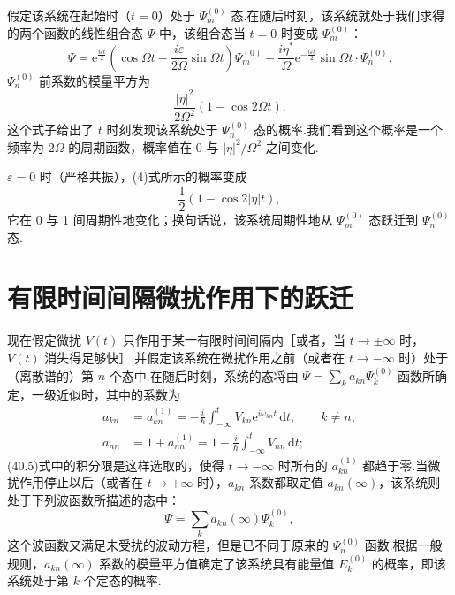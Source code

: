 \begin{xiti}
假定该系统在起始时（$t=0$）处于 $\varPsi_m^{(0)}$ 态.在随后时刻，该系统就处于我们求得的两个函数的线性组合态 $\varPsi$ 中，该组合态当 $t=0$ 时变成 $\varPsi_m^{(0)}$：
\begin{equation}
  \varPsi=\mathrm{e}^{\frac{i\varepsilon t}{2}}
  \left(\cos\Omega t-\frac{i\varepsilon}{2\Omega}\sin\Omega t\right)\varPsi_m^{(0)}
  -\frac{i\eta^{*}}{\Omega}\mathrm{e}^{-\frac{i\varepsilon t}{2}}\sin\Omega t\cdot\varPsi_n^{(0)}.
\end{equation}
$\varPsi_n^{(0)}$ 前系数的模量平方为
\begin{equation}
  \frac{|\eta|^2}{2\Omega^2}\left(1-\cos2\Omega t\right).
\end{equation}
这个式子给出了 $t$ 时刻发现该系统处于 $\varPsi_n^{(0)}$ 态的概率.我们看到这个概率是一个频率为 $2\Omega$ 的周期函数，概率值在 0 与 $|\eta|^2/\Omega^2$ 之间变化.

$\varepsilon=0$ 时（严格共振），(4)式所示的概率变成
\begin{equation*}
  \frac{1}{2}\left(1-\cos2|\eta|t\right),
\end{equation*}
它在 0 与 1 间周期性地变化；换句话说，该系统周期性地从 $\varPsi_m^{(0)}$ 态跃迁到 $\varPsi_n^{(0)}$ 态.

\end{xiti}
\renewcommand{\theequation}{\arabic{section}.\arabic{equation}}%

\section{有限时间间隔微扰作用下的跃迁}

现在假定微扰 $V(t)$ 只作用于某一有限时间间隔内［或者，当 $t\to\pm\infty$ 时，$V(t)$ 消失得足够快］.并假定该系统在微扰作用之前（或者在 $t\to-\infty$ 时）处于（离散谱的）第 $n$ 个态中.在随后时刻，系统的态将由 $\varPsi=\sum_k a_{kn}\varPsi_k^{(0)}$ 函数所确定，一级近似时，其中的系数为
\begin{equation}
\begin{aligned}
  a_{kn}&=a_{kn}^{(1)}=-\frac{i}{\hbar}\int_{-\infty}^{t}V_{kn}\mathrm{e}^{i\omega_{kn}t}\,\mathrm{d}t,
  \qquad k\neq n,\\
  a_{nn}&=1+a_{nn}^{(1)}=1-\frac{i}{\hbar}\int_{-\infty}^{t}V_{nn}\,\mathrm{d}t;
\end{aligned}
\end{equation}
(40.5)式中的积分限是这样选取的，使得 $t\to-\infty$ 时所有的 $a_{kn}^{(1)}$ 都趋于零.当微扰作用停止以后（或者在 $t\to+\infty$ 时），$a_{kn}$ 系数都取定值 $a_{kn}(\infty)$，该系统则处于下列波函数所描述的态中：
\begin{equation*}
  \varPsi=\sum_k a_{kn}(\infty)\varPsi_k^{(0)},
\end{equation*}
这个波函数又满足未受扰的波动方程，但是已不同于原来的 $\varPsi_n^{(0)}$ 函数.根据一般规则，$a_{kn}(\infty)$ 系数的模量平方值确定了该系统具有能量值 $E_k^{(0)}$ 的概率，即该系统处于第 $k$ 个定态的概率.

